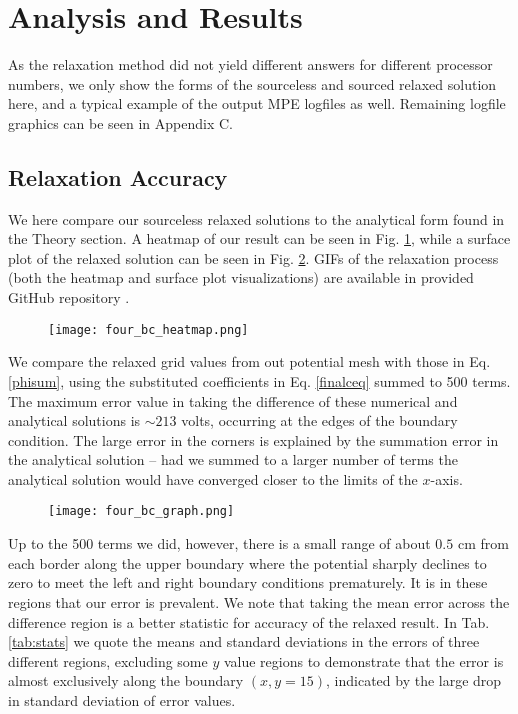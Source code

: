 \documentclass[reprint, amsmath, amssymb, aps, floatfix]{revtex4-1}
\begin{document}
\section{Analysis and Results}

As the relaxation method did not yield different answers for different processor numbers, we only show the forms of the sourceless and sourced relaxed solution here, and a typical example of the output MPE logfiles as well. Remaining logfile graphics can be seen in Appendix C.

\subsection{Relaxation Accuracy}

We here compare our sourceless relaxed solutions to the analytical form found in the Theory section. A heatmap of our result can be seen in Fig. \ref{heatmapnosource}, while a surface plot of the relaxed solution can be seen in Fig. \ref{graphnosource}. GIFs of the relaxation process (both the heatmap and surface plot visualizations) are available in provided GitHub repository \cite{git}.

\begin{figure}
	\texttt{[image: four\_bc\_heatmap.png]}
	\label{heatmapnosource}
\end{figure}

We compare the relaxed grid values from out potential mesh with those in Eq. \eqref{phisum}, using the substituted coefficients in Eq. \eqref{finalceq} summed to 500 terms. The maximum error value in taking the difference of these numerical and analytical solutions is $\sim 213$ volts, occurring at the edges of the boundary condition. The large error in the corners is explained by the summation error in the analytical solution -- had we summed to a larger number of terms the analytical solution would have converged closer to the limits of the $x$-axis. 


\begin{figure}
	\texttt{[image: four\_bc\_graph.png]}
	\label{graphnosource}
\end{figure}


Up to the 500 terms we did, however, there is a small range of about $0.5$ cm from each border along the upper boundary where the potential sharply declines to zero to meet the left and right boundary conditions prematurely. It is in these regions that our error is prevalent. We note that taking the mean error across the difference region is a better statistic for accuracy of the relaxed result. In Tab. \ref{tab:stats} we quote the means and standard deviations in the errors of three different regions, excluding some $y$ value regions to demonstrate that the error is almost exclusively along the boundary $(x, y=15)$, indicated by the large drop in standard deviation of error values.
\end{document}
